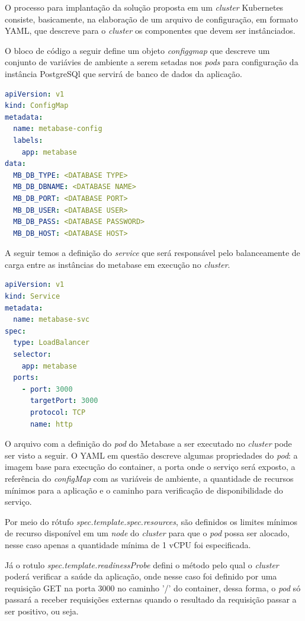 O processo para implantação da solução proposta em um \textit{cluster} Kubernetes consiste, basicamente, na elaboração de um arquivo de configuração, em formato YAML, que descreve para o \textit{cluster} os componentes que devem ser instânciados. 

O bloco de código a seguir define um objeto \textit{configgmap} que descreve um conjunto de variávies de ambiente a serem setadas nos \textit{pods} para configuração da instância PostgreSQl que servirá de banco de dados da aplicação.

\begin{lstlisting}[language=yaml]
apiVersion: v1
kind: ConfigMap
metadata:
  name: metabase-config
  labels:
    app: metabase
data:
  MB_DB_TYPE: <DATABASE TYPE>
  MB_DB_DBNAME: <DATABASE NAME>
  MB_DB_PORT: <DATABASE PORT>
  MB_DB_USER: <DATABASE USER>
  MB_DB_PASS: <DATABASE PASSWORD>
  MB_DB_HOST: <DATABASE HOST>
\end{lstlisting} 

A seguir temos a definição do \textit{service} que será responsável pelo balanceamente de carga entre as instâncias do metabase em execução no \textit{cluster}.

\begin{lstlisting}[language=yaml]
apiVersion: v1
kind: Service
metadata:
  name: metabase-svc
spec:
  type: LoadBalancer
  selector:
    app: metabase
  ports:
    - port: 3000
      targetPort: 3000
      protocol: TCP
      name: http
\end{lstlisting} 

O arquivo com a definição do \textit{pod} do Metabase a ser executado no \textit{cluster} pode ser visto a seguir. O YAML em questão descreve algumas propriedades do \textit{pod}: a imagem base para execução do container, a porta onde o serviço será exposto, a referência do \textit{configMap} com as variáveis de ambiente, a quantidade de recursos mínimos para a aplicação e o caminho para verificação de disponibilidade do serviço. 

Por meio do rótufo \textit{spec.template.spec.resources}, são definidos os limites mínimos de recurso disponível em um \textit{node} do \textit{cluster} para que o \textit{pod} possa ser alocado, nesse caso apenas a quantidade mínima de 1 vCPU foi especificada. 

Já o rotulo \textit{spec.template.readinessProbe} defini o método pelo qual o \textit{cluster} poderá verificar a saúde da aplicação, onde nesse caso foi definido por uma requisição GET na porta 3000 no caminho '/' do container, dessa forma, o \textit{pod} só passará a receber requisições externas quando o resultado da requisição passar a ser positivo, ou seja.

